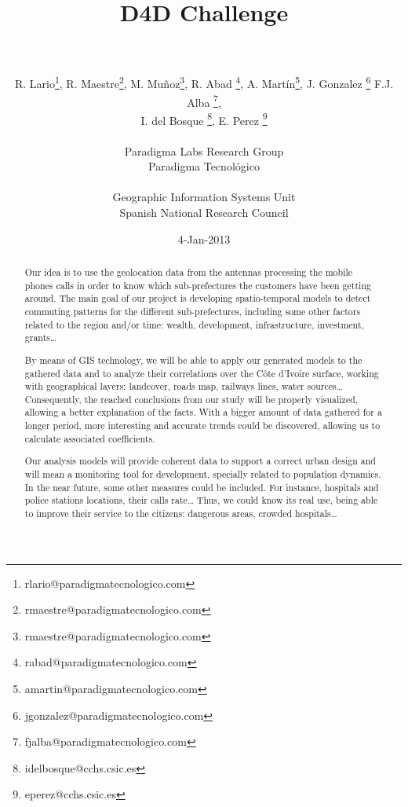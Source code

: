 \documentclass[a4paper,11pt]{article}
\begin{document}
\title{{\huge D4D Challenge} \\  \\ }

\author{{
				R. Lario\footnote{rlario@paradigmatecnologico.com}, 
				R. Maestre\footnote{rmaestre@paradigmatecnologico.com}, 
				M. Muñoz\footnote{rmaestre@paradigmatecnologico.com}, 
				R. Abad \footnote{rabad@paradigmatecnologico.com}, 
				A. Martín\footnote{amartin@paradigmatecnologico.com}, 
				J. Gonzalez \footnote{jgonzalez@paradigmatecnologico.com}
				F.J. Alba \footnote{fjalba@paradigmatecnologico.com}, \\
				I. del Bosque \footnote{idelbosque@cchs.csic.es}, 
				E. Perez \footnote{eperez@cchs.csic.es}
				}\\ \\
{\small Paradigma Labs Research Group\\ Paradigma Tecnológico} \\ \\
{\small Geographic Information Systems Unit \\ Spanish National Research Council}}

\date{4-Jan-2013}
\maketitle

\begin{abstract} 
Our idea is to use the geolocation data from the antennas processing the mobile phones calls in order to know which sub-prefectures the customers have been getting around. The main goal of our project is developing spatio-temporal models to detect commuting patterns for the different sub-prefectures, including some other factors related to the region and/or time: wealth, development, infrastructure, investment, grants…

By means of GIS technology, we will be able to apply our generated models to the gathered data and to analyze their correlations over the Côte d’Ivoire surface, working with geographical layers: landcover, roads map, railways lines, water sources… Consequently, the reached conclusions from our study will be properly visualized, allowing a better explanation of the facts.
With a bigger amount of data gathered for a longer period, more interesting and accurate trends could be discovered, allowing us to calculate associated coefficients.

Our analysis models will provide coherent data to support a correct urban design and will mean a monitoring tool for development, specially related to population dynamics.
In the near future, some other measures could be included. For instance, hospitals and police stations locations, their calls rate… Thus, we could know its real use, being able to improve their service to the citizens: dangerous areas, crowded hospitals…
\end{abstract}

\newpage
\setcounter{secnumdepth}{0}















\newpage


\end{document}
